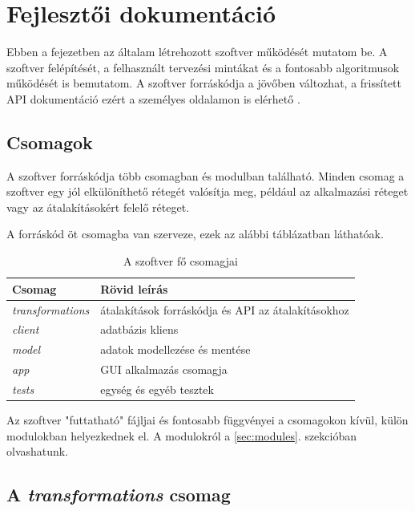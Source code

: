 \chapter{Fejlesztői dokumentáció}
\label{ch:impl}

Ebben a fejezetben az általam létrehozott szoftver működését mutatom be.
A szoftver felépítését, a felhasznált tervezési mintákat és
a fontosabb algoritmusok működését is bemutatom.
A szoftver forráskódja a jövőben változhat,
a frissített API dokumentáció ezért a személyes oldalamon is elérhető \cite{apidoc}.

\section{Csomagok}

A szoftver forráskódja több csomagban és modulban található.
Minden csomag a szoftver egy jól elkülöníthető rétegét valósítja meg,
például az alkalmazási réteget vagy az átalakításokért felelő réteget.

A forráskód öt csomagba van szerveze, ezek az alábbi táblázatban láthatóak.

\begin{table}[H]
	\centering
	\begin{tabular}{ | m{} | m{} | }
		\hline
		\textbf{Csomag} & \textbf{Rövid leírás} \\
		\hline \hline
		\emph{transformations} & átalakítások forráskódja és API az átalakításokhoz \\
		\hline
		\emph{client} & adatbázis kliens \\
		\hline
		\emph{model} & adatok modellezése és mentése \\
		\hline
		\emph{app} & GUI alkalmazás csomagja \\
		\hline
		\emph{tests} & egység és egyéb tesztek \\
		\hline
	\end{tabular}
	\caption{A szoftver fő csomagjai}
	\label{tab:packages}
\end{table}

Az szoftver "futtatható" fájljai és fontosabb függvényei
a csomagokon kívül, külön modulokban helyezkednek el.
A modulokról a \ref{sec:modules}. szekcióban olvashatunk.

\section{A \emph{transformations} csomag}

